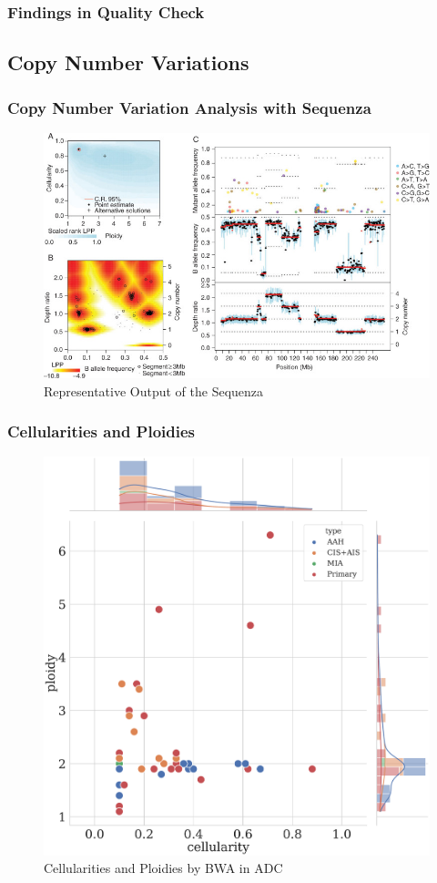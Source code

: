 \documentclass[11pt,a4paper,onecolumn,oneside]{report}
\begin{document}
            \subsubsection{Findings in Quality Check}

        \subsection{Copy Number Variations}
            \subsubsection{Copy Number Variation Analysis with Sequenza}
                \begin{figure}[p]
                    \centering
                    \includegraphics[width=0.6 \linewidth]{figures/Workflow/sequenza.jpg}
                    \caption{Representative Output of the Sequenza \protect\cite{sequenza1}}
                    \label{fig:Sequenza}
                \end{figure}

            \subsubsection{Cellularities and Ploidies}
                \begin{figure}[p]
                    \centering
                    \includegraphics[width=0.6 \linewidth]{figures/Sequenza/BWA-sequenza-ADC.pdf}
                    \caption{Cellularities and Ploidies by BWA in ADC}
                    \label{fig:sequenza-BWA-ADC}
                \end{figure}
\end{document}
